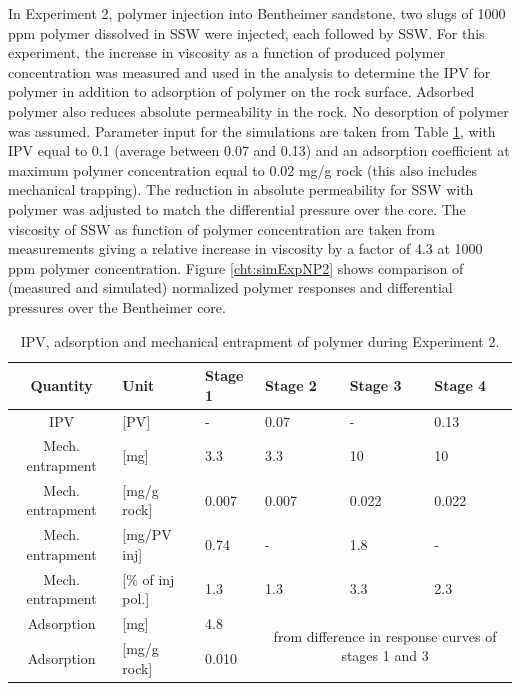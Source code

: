 \documentclass[nanomaterials,article,submit,moreauthors,pdftex]{Definitions/mdpi}
\begin{document}
In Experiment 2, polymer injection into Bentheimer sandstone, two slugs of 1000 ppm polymer dissolved in SSW were injected, each followed by SSW. For this experiment, the increase in viscosity as a function of produced polymer concentration was measured and used in the analysis to determine the IPV for polymer in addition to adsorption of polymer on the rock surface. Adsorbed polymer also reduces absolute permeability in the rock. No desorption of polymer was assumed. Parameter input for the simulations are taken from Table \ref{tab:ipvexp2}, with IPV equal to 0.1 (average between 0.07 and 0.13) and an adsorption coefficient at maximum polymer concentration equal to 0.02 mg/g rock (this also includes mechanical trapping). The reduction in absolute permeability for SSW with polymer was adjusted to match the differential pressure over the core. The viscosity of SSW as function of polymer concentration are taken from measurements giving a relative increase in viscosity by a factor of 4.3 at 1000 ppm polymer concentration. Figure \ref{cht:simExpNP2} shows comparison of (measured and simulated) normalized polymer responses and differential pressures over the Bentheimer core.

\begin{table}[h!] 
\small
\centering
\caption{IPV, adsorption and mechanical entrapment of polymer during Experiment 2.}
\label{tab:ipvexp2}
\begin{tabular}{c l l l l l } 
\toprule
\textbf{Quantity} & \textbf{Unit} & \textbf{Stage 1} & \textbf{Stage 2} & \textbf{Stage 3} & \textbf{Stage 4} \\ 
\midrule 
IPV                & [PV]           & -         & 0.07     & -         & 0.13     \\
Mech. entrapment   & [mg]          & 3.3       & 3.3       & 10       & 10       \\ 
Mech. entrapment   & [mg/g rock]   & 0.007     & 0.007     & 0.022     & 0.022     \\ 
Mech. entrapment   & [mg/PV inj]   & 0.74      & -         & 1.8      & -         \\
Mech. entrapment   & [\% of inj pol.]& 1.3       & 1.3       & 3.3       & 2.3       \\ 
Adsorption         & [mg]          & 4.8       &   \multicolumn{3}{c}{\multirow{2}{15em}{from difference in response curves of stages 1 and 3}}        \\
Adsorption         & [mg/g rock]   & 0.010      &  \multicolumn{3}{c}{}    \\ 
\bottomrule
\end{tabular}
\end{table}
\end{document}
